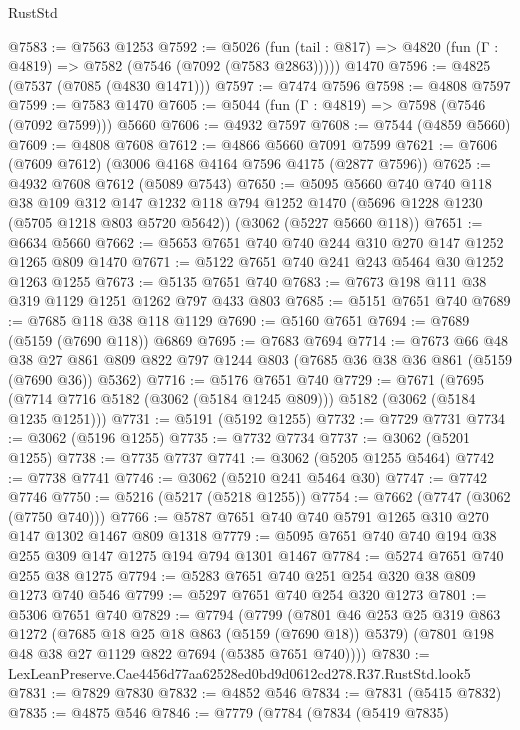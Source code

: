 \begin{lexlean}{RustStd}
\begin{coremodule}
@7583 := @7563 @1253
@7592 := @5026
    (fun (tail : @817) => @4820 (fun (Γ : @4819) => @7582 (@7546 (@7092 (@7583 @2863)))))
    @1470
@7596 := @4825 (@7537 (@7085 (@4830 @1471)))
@7597 := @7474 @7596
@7598 := @4808 @7597
@7599 := @7583 @1470
@7605 := @5044 (fun (Γ : @4819) => @7598 (@7546 (@7092 @7599))) @5660
@7606 := @4932 @7597
@7608 := @7544 (@4859 @5660)
@7609 := @4808 @7608
@7612 := @4866 @5660 @7091 @7599
@7621 := @7606 (@7609 @7612) (@3006 @4168 @4164 @7596 @4175 (@2877 @7596))
@7625 := @4932 @7608 @7612 (@5089 @7543)
@7650 := @5095
    @5660
    @740
    @740
    @118
    @38
    @109
    @312
    @147
    @1232
    @118
    @794
    @1252
    @1470
    (@5696 @1228 @1230 (@5705 @1218 @803 @5720 @5642))
    (@3062 (@5227 @5660 @118))
@7651 := @6634 @5660
@7662 := @5653 @7651 @740 @740 @244 @310 @270 @147 @1252 @1265 @809 @1470
@7671 := @5122 @7651 @740 @241 @243 @5464 @30 @1252 @1263 @1255
@7673 := @5135 @7651 @740
@7683 := @7673 @198 @111 @38 @319 @1129 @1251 @1262 @797 @433 @803
@7685 := @5151 @7651 @740
@7689 := @7685 @118 @38 @118 @1129
@7690 := @5160 @7651
@7694 := @7689 (@5159 (@7690 @118)) @6869
@7695 := @7683 @7694
@7714 := @7673
    @66
    @48
    @38
    @27
    @861
    @809
    @822
    @797
    @1244
    @803
    (@7685 @36 @38 @36 @861 (@5159 (@7690 @36)) @5362)
@7716 := @5176 @7651 @740
@7729 := @7671
    (@7695 (@7714 @7716 @5182 (@3062 (@5184 @1245 @809))) @5182 (@3062 (@5184 @1235 @1251)))
@7731 := @5191 (@5192 @1255)
@7732 := @7729 @7731
@7734 := @3062 (@5196 @1255)
@7735 := @7732 @7734
@7737 := @3062 (@5201 @1255)
@7738 := @7735 @7737
@7741 := @3062 (@5205 @1255 @5464)
@7742 := @7738 @7741
@7746 := @3062 (@5210 @241 @5464 @30)
@7747 := @7742 @7746
@7750 := @5216 (@5217 (@5218 @1255))
@7754 := @7662 (@7747 (@3062 (@7750 @740)))
@7766 := @5787 @7651 @740 @740 @5791 @1265 @310 @270 @147 @1302 @1467 @809 @1318
@7779 := @5095 @7651 @740 @740 @194 @38 @255 @309 @147 @1275 @194 @794 @1301 @1467
@7784 := @5274 @7651 @740 @255 @38 @1275
@7794 := @5283 @7651 @740 @251 @254 @320 @38 @809 @1273 @740 @546
@7799 := @5297 @7651 @740 @254 @320 @1273
@7801 := @5306 @7651 @740
@7829 := @7794
    (@7799
      (@7801
        @46
        @253
        @25
        @319
        @863
        @1272
        (@7685 @18 @25 @18 @863 (@5159 (@7690 @18)) @5379)
        (@7801 @198 @48 @38 @27 @1129 @822 @7694 (@5385 @7651 @740))))
@7830 := LexLeanPreserve.Cae4456d77aa62528ed0bd9d0612cd278.R37.RustStd.look5
@7831 := @7829 @7830
@7832 := @4852 @546
@7834 := @7831 (@5415 @7832)
@7835 := @4875 @546
@7846 := @7779
    (@7784
      (@7834
        (@5419 @7835)

\end{coremodule}
\end{lexlean}

